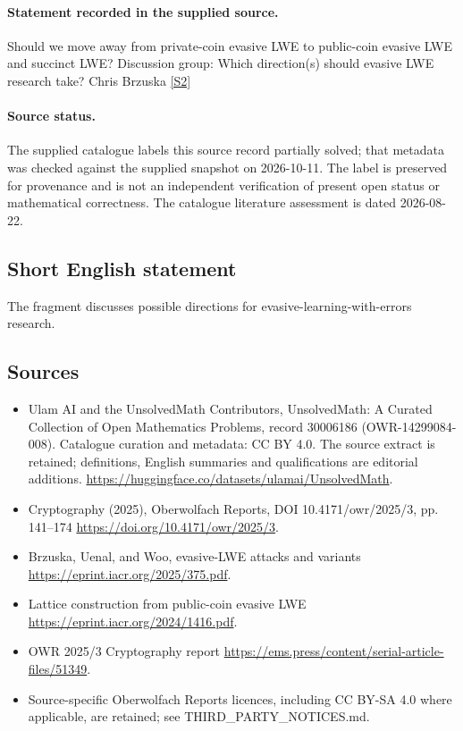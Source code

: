 \documentclass[11pt]{article}
\newcommand{\sref}[2]{\hyperlink{source:#1:#2}{[S#2]}}
\begin{document}
\paragraph{Statement recorded in the supplied source.}
Should we move away from private-coin evasive LWE to public-coin evasive LWE and succinct LWE? Discussion group: Which direction(s) should evasive LWE research take? Chris Brzuska \sref{30006186}{2}
\paragraph{Source status.}
The supplied catalogue labels this source record partially solved; that metadata was checked against the supplied snapshot on 2026-10-11. The label is preserved for provenance and is not an independent verification of present open status or mathematical correctness. The catalogue literature assessment is dated 2026-08-22.
\subsection{Short English statement}
The fragment discusses possible directions for evasive-learning-with-errors research.
\subsection{Sources}
\begin{itemize}
\item[\hypertarget{source:30006186:1}{S1}] Ulam AI and the UnsolvedMath Contributors, UnsolvedMath: A Curated Collection of Open Mathematics Problems, record 30006186 (OWR-14299084-008). Catalogue curation and metadata: CC BY 4.0. The source extract is retained; definitions, English summaries and qualifications are editorial additions.
\url{https://huggingface.co/datasets/ulamai/UnsolvedMath}.
\item[\hypertarget{source:30006186:2}{S2}] Cryptography (2025), Oberwolfach Reports, DOI 10.4171/owr/2025/3, pp. 141--174
\url{https://doi.org/10.4171/owr/2025/3}.
\item[\hypertarget{source:30006186:3}{S3}] Brzuska, Uenal, and Woo, evasive-LWE attacks and variants
\url{https://eprint.iacr.org/2025/375.pdf}.
\item[\hypertarget{source:30006186:4}{S4}] Lattice construction from public-coin evasive LWE
\url{https://eprint.iacr.org/2024/1416.pdf}.
\item[\hypertarget{source:30006186:5}{S5}] OWR 2025/3 Cryptography report
\url{https://ems.press/content/serial-article-files/51349}.
\item Source-specific Oberwolfach Reports licences, including CC BY-SA 4.0 where applicable, are retained; see THIRD\_PARTY\_NOTICES.md.
\end{itemize}
\end{document}

